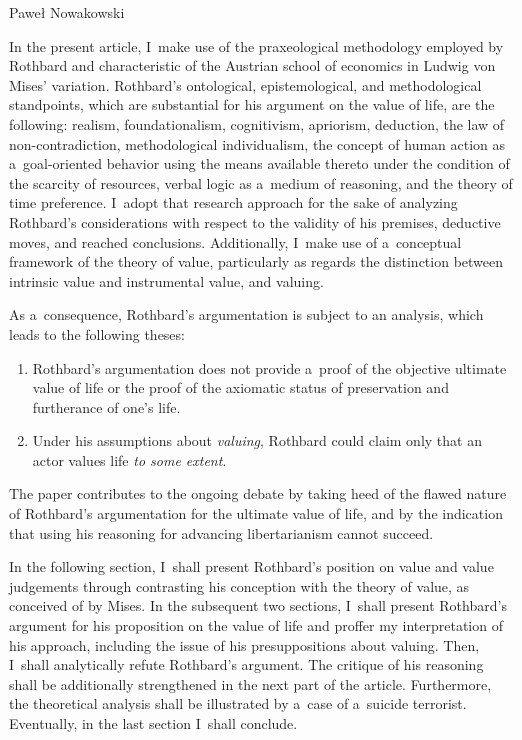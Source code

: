 \begin{artengenv}{Paweł Nowakowski}
\enlargethispage{1.5\baselineskip}

In the present article, I~make use of the praxeological methodology employed by Rothbard and characteristic of the Austrian school of economics in Ludwig von Mises' variation. Rothbard's ontological, epistemological, and methodological standpoints, which are substantial for his argument on the value of life, are the following: realism, foundationalism, cognitivism, apriorism, deduction, the law of non-contradiction, methodological individualism, the concept of human action as a~goal-oriented behavior using the means available thereto under the condition of the scarcity of resources, verbal logic as a~medium of reasoning, and the theory of time preference. I~adopt that research approach for the sake of analyzing Rothbard's considerations with respect to the validity of his premises, deductive moves, and reached conclusions. Additionally, I~make use of a~conceptual framework of the theory of value, particularly as regards the distinction between intrinsic value and instrumental value, and valuing.



As a~consequence, Rothbard's argumentation is subject to an analysis, which leads to the following theses:

\begin{enumerate}[label=\arabic*)]
\item  Rothbard's argumentation does not provide a~proof of the objective ultimate value of life or the proof of the axiomatic status of preservation and furtherance of one's life.
\item Under his assumptions about \textit{valuing}, Rothbard could claim only that an actor values life \textit{to some extent}.
\end{enumerate}

The paper contributes to the ongoing debate by taking heed of the flawed nature of Rothbard's argumentation for the ultimate value of life, and by the indication that using his reasoning for advancing libertarianism cannot succeed.



In the following section, I~shall present Rothbard's position on value and value judgements through contrasting his conception with the theory of value, as conceived of by Mises. In the subsequent two sections, I~shall present Rothbard's argument for his proposition on the value of life and proffer my interpretation of his approach, including the issue of his presuppositions about valuing. Then, I~shall analytically refute Rothbard's argument. The critique of his reasoning shall be additionally strengthened in the next part of the article. Furthermore, the theoretical analysis shall be illustrated by a~case of a~suicide terrorist. Eventually, in the last section I~shall conclude.
\enlargethispage{2.5\baselineskip}



\end{artengenv}
